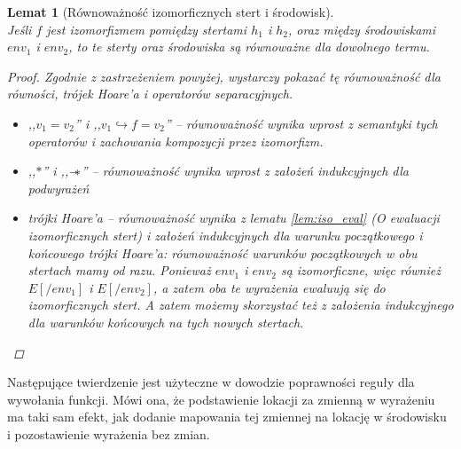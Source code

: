 \documentclass[]{pracamgr}
\newcommand \wand {\mathrel{-\mkern-6mu*}}
\renewcommand \| {\hspace{0.75em} | \hspace{0.75em} }
\renewcommand \[ {[\![}
\renewcommand \] {]\!]}
\newtheorem{lemma}{Lemat}
\theoremstyle{definition}
\begin{document}
\begin{lemma}[Równoważność izomorficznych stert i środowisk] {\ } \\
\label{lem:iso_equiv}
Jeśli $f$ jest izomorfizmem pomiędzy stertami $h_1$ i $h_2$, oraz między środowiskami
$env_1$ i $env_2$, to te sterty oraz środowiska są równoważne dla dowolnego termu.
\begin{proof}
Zgodnie z zastrzeżeniem powyżej, wystarczy pokazać tę równoważność dla równości, trójek Hoare'a
i operatorów separacyjnych.
\begin{itemize}
 \item ,,$v_1 = v_2$'' i ,,$v_1 \hookrightarrow f = v_2$'' --
 równoważność wynika wprost z semantyki
 tych operatorów i zachowania kompozycji przez izomorfizm.
 \item ,,$*$'' i ,,$\wand$'' -- równoważność wynika wprost z założeń indukcyjnych dla podwyrażeń
 \item trójki Hoare'a -- równoważność wynika z lematu \ref{lem:iso_eval} (O ewaluacji
 izomorficznych stert) i założeń indukcyjnych
 dla warunku początkowego i końcowego trójki Hoare'a: równoważność
 warunków początkowych w obu stertach mamy od razu. Ponieważ $env_1$ i $env_2$ są izomorficzne,
 więc również $E[/env_1]$ i $E[/env_2]$, a zatem oba te wyrażenia ewaluują się do izomorficznych
 stert. A zatem możemy skorzystać też z założenia indukcyjnego dla warunków końcowych na
 tych nowych stertach.
\end{itemize}
\end{proof}
\end{lemma}

Następujące twierdzenie jest użyteczne w dowodzie poprawności reguły dla wywołania funkcji.
Mówi ona, że podstawienie lokacji za zmienną w wyrażeniu ma taki sam efekt, jak
dodanie mapowania tej zmiennej na lokację w środowisku i pozostawienie wyrażenia bez zmian.
\end{document}
